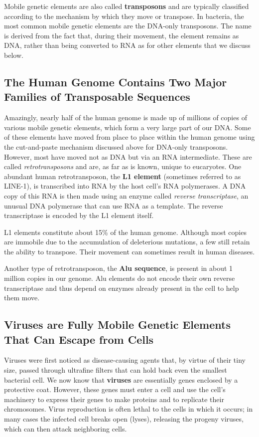 Mobile genetic elements are also called \textbf{transposons} and are typically
classified according to the mechanism by which they move or transpose.
In bacteria, the most common mobile genetic elements are the DNA-only
transposons. The name is derived from the fact that, during their movement,
the element remains as DNA, rather than being converted to RNA as
for other elements that we discuss below.

\subsection{The Human Genome Contains Two Major Families of Transposable Sequences}

Amazingly, nearly half of the human genome is made up of millions of
copies of various mobile genetic elements, which form a very large part
of our DNA. Some of these elements have moved from place to place
within the human genome using the cut-and-paste mechanism discussed
above for DNA-only transposons. However, most have
moved not as DNA but via an RNA intermediate. These are called \textit{retrotransposons}
and are, as far as is known, unique to eucaryotes.
One abundant human retrotransposon, the \textbf{L1 element} (sometimes referred
to as LINE-1), is transcribed into RNA by the host cell’s RNA polymerases.
A DNA copy of this RNA is then made using an enzyme called \textit{reverse
transcriptase}, an unusual DNA polymerase that can use RNA as a template.
The reverse transcriptase is encoded by the L1 element itself.

L1 elements constitute about 15\% of the human genome. Although most
copies are immobile due to the accumulation of deleterious mutations, a
few still retain the ability to transpose. Their movement can sometimes
result in human diseases.

Another type of retrotransposon, the \textbf{Alu sequence}, is present in about
1 million copies in our genome. Alu elements do not encode their own
reverse transcriptase and thus depend on enzymes already present in the
cell to help them move.

\subsection{Viruses are Fully Mobile Genetic Elements That Can Escape from Cells}

Viruses were first noticed as disease-causing agents that, by virtue of
their tiny size, passed through ultrafine filters that can hold back even the
smallest bacterial cell. We now know that \textbf{viruses} are essentially genes
enclosed by a protective coat.
However, these genes must enter a
cell and use the cell’s machinery to express their genes to make proteins
and to replicate their chromosomes. Virus reproduction is often lethal to
the cells in which it occurs; in many cases the infected cell breaks open
(lyses), releasing the progeny viruses, which can then attack neighboring
cells.

